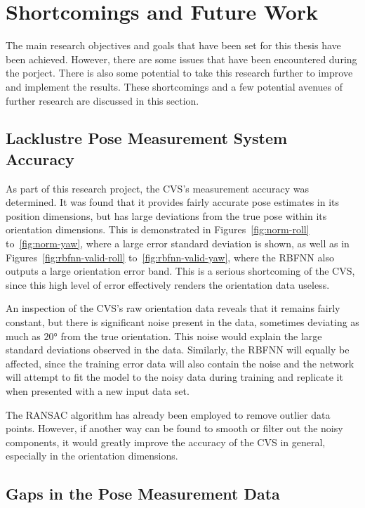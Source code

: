 \section{Shortcomings and Future Work}

The main research objectives and goals that have been set for this thesis have been achieved. However, there are some issues that have been encountered during the porject. There is also some potential to take this research further to improve and implement the results. These shortcomings and a few potential avenues of further research are discussed in this section. 

\subsection{Lacklustre Pose Measurement System Accuracy}

As part of this research project, the CVS's measurement accuracy was determined. It was found that it provides fairly accurate pose estimates in its position dimensions, but has large deviations from the true pose within its orientation dimensions. This is demonstrated in Figures~\ref{fig:norm-roll} to~\ref{fig:norm-yaw}, where a large error standard deviation is shown, as well as in Figures~\ref{fig:rbfnn-valid-roll} to~\ref{fig:rbfnn-valid-yaw}, where the RBFNN also outputs a large orientation error band. This is a serious shortcoming of the CVS, since this high level of error effectively renders the orientation data useless. 

An inspection of the CVS's raw orientation data reveals that it remains fairly constant, but there is significant noise present in the data, sometimes deviating as much as $\ang{20}$ from the true orientation. This noise would explain the large standard deviations observed in the data. Similarly, the RBFNN will equally be affected, since the training error data will also contain the noise and the network will attempt to fit the model to the noisy data during training and replicate it when presented with a new input data set. 

The RANSAC algorithm has already been employed to remove outlier data points. However, if another way can be found to smooth or filter out the noisy components, it would greatly improve the accuracy of the CVS in general, especially in the orientation dimensions. 

\subsection{Gaps in the Pose Measurement Data}

